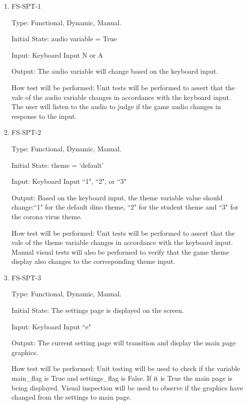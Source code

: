 \documentclass[12pt, titlepage]{article}
\begin{document}
\begin{enumerate}

\item{FS-SPT-1\\}

Type: Functional, Dynamic, Manual.
					
Initial State: audio variable = True
					
Input: Keyboard Input N or A 
					
Output: The audio variable will change based on the keyboard input. 
					
How test will be performed: Unit tests will be performed to assert that the vale of the audio variable changes in accordance with the keyboard input. The user will listen to the audio to judge if the game audio changes in response to the input.


					
\item{FS-SPT-2\\}

Type: Functional, Dynamic, Manual.
					
Initial State: theme = `default'
					
Input: Keyboard Input ``1", ``2", or ``3"
					
Output: Based on the keyboard input, the theme variable value should change:``1" for the default dino theme, ``2" for the student theme and ``3" for the corona virus theme.
					
How test will be performed: Unit tests will be performed to assert that the vale of the theme variable changes in accordance with the keyboard input.
Manual visual tests will also be performed to verify that the game theme display also changes to the corresponding theme input.



\item{FS-SPT-3\\}

Type: Functional, Dynamic, Manual.
					
Initial State: The settings page is displayed on the screen. 
					
Input: Keyboard Input ``e"
					
Output: The current setting page will transition and display the main page graphics. 
					
How test will be performed: Unit testing will be used to check if the variable main\_flag is True and settings\_flag is False. If it is True the main page is being displayed. Visual inspection will be used to observe if the graphics have changed from the settings to main page. 

\end{enumerate}
\end{document}
